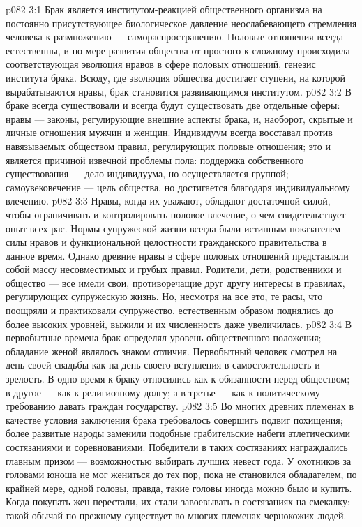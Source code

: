 \vs p082 3:1 Брак является институтом\hyp{}реакцией общественного организма на постоянно присутствующее биологическое давление неослабевающего стремления человека к размножению --- самораспространению. Половые отношения всегда естественны, и по мере развития общества от простого к сложному происходила соответствующая эволюция нравов в сфере половых отношений, генезис института брака. Всюду, где эволюция общества достигает ступени, на которой вырабатываются нравы, брак становится развивающимся институтом.
\vs p082 3:2 В браке всегда существовали и всегда будут существовать две отдельные сферы: нравы --- законы, регулирующие внешние аспекты брака, и, наоборот, скрытые и личные отношения мужчин и женщин. Индивидуум всегда восставал против навязываемых обществом правил, регулирующих половые отношения; это и является причиной извечной проблемы пола: поддержка собственного существования --- дело индивидуума, но осуществляется группой; самоувековечение --- цель общества, но достигается благодаря индивидуальному влечению.
\vs p082 3:3 Нравы, когда их уважают, обладают достаточной силой, чтобы ограничивать и контролировать половое влечение, о чем свидетельствует опыт всех рас. Нормы супружеской жизни всегда были истинным показателем силы нравов и функциональной целостности гражданского правительства в данное время. Однако древние нравы в сфере половых отношений представляли собой массу несовместимых и грубых правил. Родители, дети, родственники и общество --- все имели свои, противоречащие друг другу интересы в правилах, регулирующих супружескую жизнь. Но, несмотря на все это, те расы, что поощряли и практиковали супружество, естественным образом поднялись до более высоких уровней, выжили и их численность даже увеличилась.
\vs p082 3:4 \pc В первобытные времена брак определял уровень общественного положения; обладание женой являлось знаком отличия. Первобытный человек смотрел на день своей свадьбы как на день своего вступления в самостоятельность и зрелость. В одно время к браку относились как к обязанности перед обществом; в другое --- как к религиозному долгу; а в третье --- как к политическому требованию давать граждан государству.
\vs p082 3:5 Во многих древних племенах в качестве условия заключения брака требовалось совершить подвиг похищения; более развитые народы заменили подобные грабительские набеги атлетическими состязаниями и соревнованиями. Победители в таких состязаниях награждались главным призом --- возможностью выбирать лучших невест года. У охотников за головами юноша не мог жениться до тех пор, пока не становился обладателем, по крайней мере, одной головы, правда, такие головы иногда можно было и купить. Когда покупать жен перестали, их стали завоевывать в состязаниях на смекалку; такой обычай по\hyp{}прежнему существует во многих племенах чернокожих людей.
